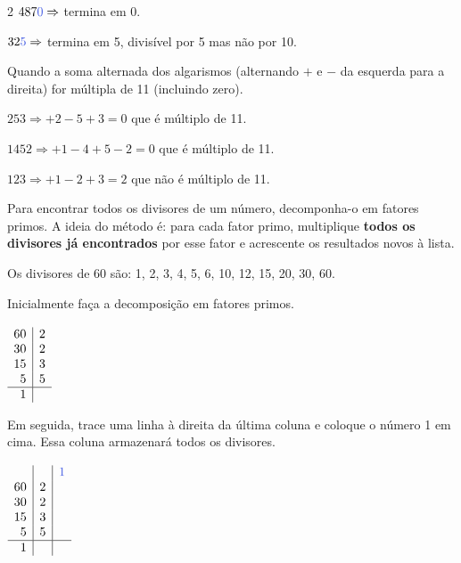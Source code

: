 \documentclass[12pt]{article}
\begin{document}
\begin{multicols}{2}
$487\textcolor{iris}{0} \Rightarrow$ termina em 0.

$32\textcolor{iris}{5} \Rightarrow$ termina em 5, divisível por 5 mas não por 10.


Quando a soma alternada dos algarismos (alternando $+$ e $-$ da esquerda para a direita) for múltipla de 11 (incluindo zero).


$253 \Rightarrow +2-5+3 = 0 $ que é múltiplo de 11.

$1452 \Rightarrow +1-4+5-2 = 0 $ que é múltiplo de 11.

$123 \Rightarrow +1-2+3 = 2 $ que não é múltiplo de 11.


Para encontrar todos os divisores de um número, decomponha-o em fatores primos. A ideia do método é: para cada fator primo, multiplique \textbf{todos os divisores já encontrados} por esse fator e acrescente os resultados novos à lista.


Os divisores de 60 são: 1, 2, 3, 4, 5, 6, 10, 12, 15, 20, 30, 60.

Inicialmente faça a decomposição em fatores primos.

\vspace{8px}
$\begin{array}[t]{r |l}
60&2\\
30&2\\
15&3\\
5&5\\
\hline1&\\
\end{array}$
\vspace{8px}

Em seguida, trace uma linha à direita da última coluna e coloque o número 1 em cima. Essa coluna armazenará todos os divisores.

\vspace{8px}
$\begin{array}[t]{r |l|l}&&\textcolor{iris}{1}\\
60&2\\
30&2\\
15&3\\
5&5\\
\hline1&\\
\end{array}$
\vspace{8px}


\end{multicols}
\end{document}
